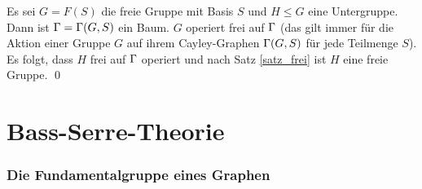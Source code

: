 \documentclass[a4paper, 12pt, twoside]{article}
\begin{document}
\bew
Es sei $G=F(S)$ die freie Gruppe mit Basis $S$ und $H\leq G$ eine
Untergruppe.
Dann ist $\Gamma=\Gamma(G,S)$ ein Baum.
$G$ operiert frei auf $\Gamma$ (das gilt immer für die Aktion einer
Gruppe $G$ auf ihrem Cayley-Graphen $\Gamma(G,S)$ für jede Teilmenge $S$).
Es folgt, dass $H$ frei auf $\Gamma$ operiert und nach Satz \ref{satz_frei}
ist $H$ eine freie Gruppe.
\qed

\cleardoublepage
\part{Bass-Serre-Theorie}

\section{Die Fundamentalgruppe eines Graphen}\label{sec_FG}
\end{document}
